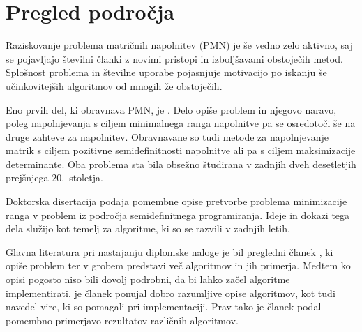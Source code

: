 \chapter{Pregled področja} \label{1407-1010}

Raziskovanje problema matričnih napolnitev (PMN) je še vedno zelo aktivno, saj se pojavljajo številni članki z novimi pristopi in izboljšavami obstoječih metod.  Splošnost problema in številne uporabe pojasnjuje motivacijo po iskanju še učinkovitejših algoritmov od mnogih že obstoječih.

Eno prvih del, ki obravnava PMN, je \cite{MCPAS}. Delo opiše problem in njegovo naravo, poleg napolnjevanja s ciljem minimalnega ranga napolnitve pa se osredotoči še na druge zahteve za napolnitev. Obravnavane so tudi metode za napolnjevanje matrik s ciljem pozitivne semidefinitnosti napolnitve ali pa s ciljem maksimizacije determinante. Oba problema sta bila obsežno študirana v zadnjih dveh desetletjih prejšnjega 20.\ stoletja. \cite{Barret, Dancis,Woerdeman}

Doktorska disertacija \cite{NNM-PHD} podaja pomembne opise pretvorbe problema minimizacije ranga v problem iz področja semidefinitnega programiranja. Ideje in dokazi tega dela služijo kot temelj za algoritme, ki so se razvili v zadnjih letih.

Glavna literatura pri nastajanju diplomske naloge je bil pregledni članek \cite{Survey-NKS19}, ki opiše problem ter v grobem predstavi več algoritmov in jih primerja. Medtem ko opisi pogosto niso bili dovolj podrobni, da bi lahko začel algoritme implementirati, je članek ponujal dobro razumljive opise algoritmov, kot tudi navedel vire, ki so pomagali pri implementaciji. Prav tako je članek podal pomembno primerjavo rezultatov različnih algoritmov.

